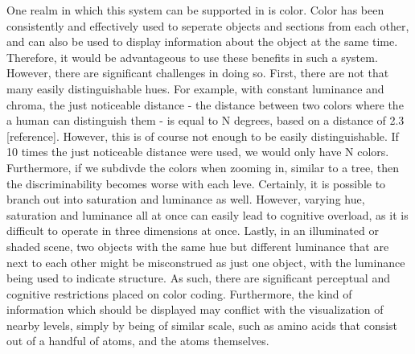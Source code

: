 \documentclass[review,journal]{vgtc}         %
\begin{document}
One realm in which this system can be supported in is color. Color has been consistently and effectively used to seperate objects and sections from each other, and can also be used to display information about the object at the same time. 
Therefore, it would be advantageous to use these benefits in such a system. 
However, there are significant challenges in doing so. First, there are not that many easily distinguishable hues. 
For example, with constant luminance and chroma, the just noticeable distance - the distance between two colors where the a human can distinguish them - is equal to N degrees, based on a distance of 2.3 [reference]. However, this is of course not enough to be easily distinguishable. If 10 times the just noticeable distance were used, we would only have N colors. Furthermore, if we subdivde the colors when zooming in, similar to a tree, then the discriminability becomes worse with each leve. Certainly, it is possible to branch out into saturation and luminance as well. However, varying hue, saturation and luminance all at once can easily lead to cognitive overload, as it is difficult to operate in three dimensions at once. Lastly, in an illuminated or shaded scene, two objects with the same hue but different luminance that are next to each other might be misconstrued as just one object, with the luminance being used to indicate structure. As such, there are significant perceptual and cognitive restrictions placed on color coding. Furthermore, the kind of information which should be displayed may conflict with the visualization of nearby levels, simply by being of similar scale, such as amino acids that consist out of a handful of atoms, and the atoms themselves.
\end{document}
